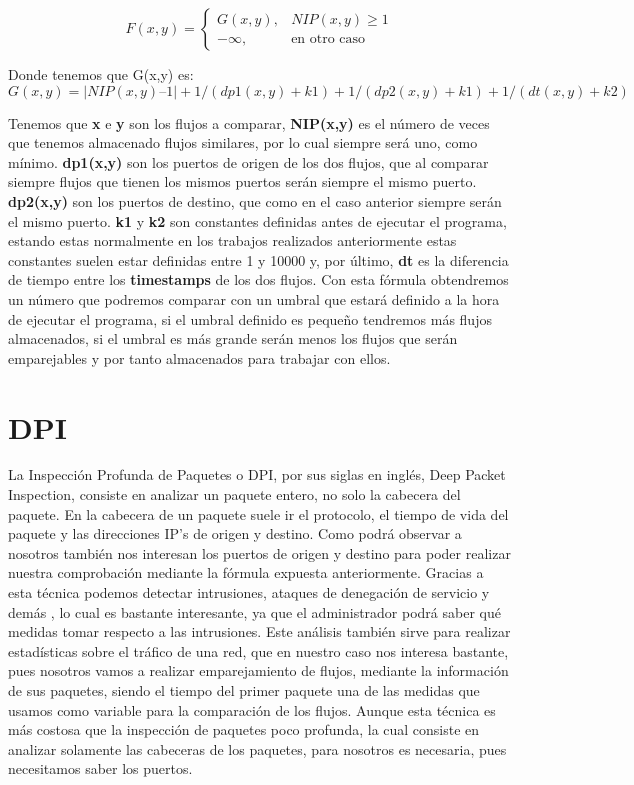 \begin{equation*}
	F(x,y)=
 	\begin{cases}
	  G(x,y), & NIP(x,y) \geq 1 \\
	  -\infty, & \text{en otro caso}
	 \end{cases}
\end{equation*}

\noindent Donde tenemos que G(x,y) es:
\intro
\begin{displaymath}
G(x,y) = |NIP(x,y) – 1| + 1 / (dp1(x,y) + k1) + 1 / (dp2(x,y) + k1) + 1 / (dt(x,y) + k2)
\end{displaymath}

\noindent Tenemos que \textbf{x} e \textbf{y} son los flujos a comparar, \textbf{NIP(x,y)} es el número 
de veces que tenemos almacenado flujos similares, por lo cual siempre 
será uno, como mínimo. \textbf{dp1(x,y)} son los puertos de origen de los dos 
flujos, que al comparar siempre flujos que tienen los mismos puertos serán siempre el mismo puerto.
\textbf{dp2(x,y)} son los puertos de destino, que como en el caso anterior siempre serán el mismo puerto.
\textbf{k1} y \textbf{k2} son constantes definidas antes de ejecutar el programa, 
estando estas normalmente en los trabajos realizados anteriormente estas constantes suelen estar 
definidas entre 1 y 10000 y, por último, \textbf{dt} es la diferencia de tiempo entre 
los \textbf{timestamps} de los dos flujos.
\intro
Con esta fórmula obtendremos un número que podremos comparar con un 
umbral que estará definido a la hora de ejecutar el programa, si el umbral 
definido es pequeño tendremos más flujos almacenados, si el umbral es más grande serán 
menos los flujos que serán emparejables y por tanto almacenados para trabajar con ellos. \cite{comparacion}

\section{DPI}

La Inspección Profunda de Paquetes o DPI, por sus siglas en inglés, Deep 
Packet Inspection, consiste en analizar un paquete entero, no solo la 
cabecera del paquete. En la cabecera de un paquete suele ir el protocolo, 
el tiempo de vida del paquete y las direcciones IP's de origen y destino. Como 
podrá observar a nosotros también nos interesan los puertos de origen y destino para poder 
realizar nuestra comprobación mediante la fórmula expuesta anteriormente.
Gracias a esta técnica podemos detectar intrusiones, ataques de denegación de servicio 
y demás \cite{dpiaproximacion}, lo cual es bastante 
interesante, ya que el administrador podrá saber qué medidas tomar respecto a las 
intrusiones. Este análisis también sirve para realizar estadísticas 
sobre el tráfico de una red, que en nuestro caso nos interesa bastante, 
pues nosotros vamos a realizar emparejamiento de flujos, mediante la 
información de sus paquetes, siendo el tiempo del primer paquete una de las 
medidas que usamos como variable para la comparación de los flujos. Aunque esta 
técnica es más costosa que la inspección de paquetes poco profunda, la 
cual consiste en analizar solamente las cabeceras de los paquetes, para nosotros es necesaria, 
pues necesitamos saber los puertos.

